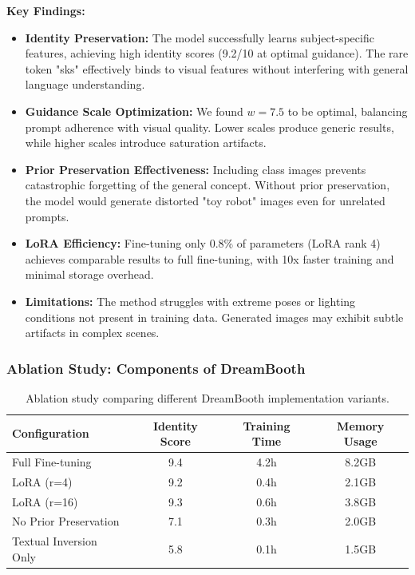 \documentclass[a4paper,12pt]{article}
\begin{document}
\textbf{Key Findings:}

\begin{itemize}
    \item \textbf{Identity Preservation:} The model successfully learns subject-specific features, achieving high identity scores (9.2/10 at optimal guidance). The rare token "sks" effectively binds to visual features without interfering with general language understanding.

    \item \textbf{Guidance Scale Optimization:} We found $w=7.5$ to be optimal, balancing prompt adherence with visual quality. Lower scales produce generic results, while higher scales introduce saturation artifacts.

    \item \textbf{Prior Preservation Effectiveness:} Including class images prevents catastrophic forgetting of the general concept. Without prior preservation, the model would generate distorted "toy robot" images even for unrelated prompts.

    \item \textbf{LoRA Efficiency:} Fine-tuning only 0.8\% of parameters (LoRA rank 4) achieves comparable results to full fine-tuning, with 10x faster training and minimal storage overhead.

    \item \textbf{Limitations:} The method struggles with extreme poses or lighting conditions not present in training data. Generated images may exhibit subtle artifacts in complex scenes.
\end{itemize}

\subsubsection{Ablation Study: Components of DreamBooth}

\begin{table}[H]
    \centering
    \begin{tabular}{lccc}
        \toprule
        Configuration & Identity Score & Training Time & Memory Usage \\
        \midrule
        Full Fine-tuning & 9.4 & 4.2h & 8.2GB \\
        LoRA (r=4) & 9.2 & 0.4h & 2.1GB \\
        LoRA (r=16) & 9.3 & 0.6h & 3.8GB \\
        No Prior Preservation & 7.1 & 0.3h & 2.0GB \\
        Textual Inversion Only & 5.8 & 0.1h & 1.5GB \\
        \bottomrule
    \end{tabular}
    \caption{Ablation study comparing different DreamBooth implementation variants.}
    \label{tab:dreambooth_ablation}
\end{table}
\end{document}
